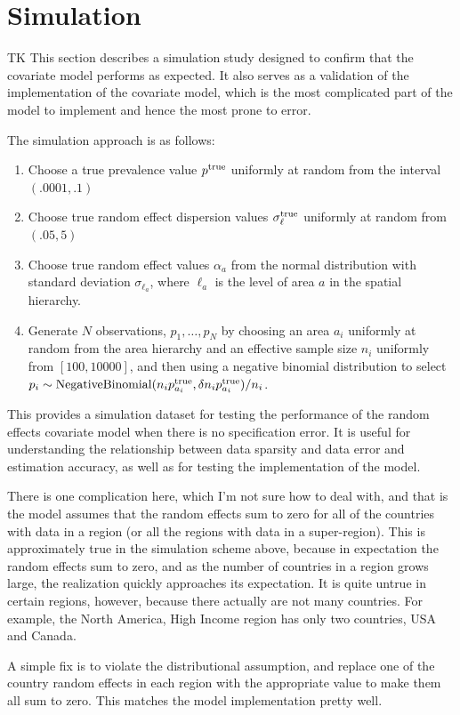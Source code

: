 \section{Simulation}
TK This section describes a simulation study designed to confirm that
the covariate model performs as expected.  It also serves as a
validation of the implementation of the covariate model, which is the
most complicated part of the model to implement and hence the most
prone to error.

The simulation approach is as follows:
\begin{enumerate}
\item Choose a true prevalence value $p^{\text{true}}$ uniformly at random
  from the interval $(.0001, .1)$
\item Choose true random effect dispersion values $\sigma_\ell^{\text{true}}$
  uniformly at random from $(.05, 5)$ \item Choose true random effect
  values $\alpha_a$ from the normal distribution with standard
  deviation $\sigma_{\ell_a}$, where $\ell_a$ is the level of area $a$
  in the spatial hierarchy.
\item Generate $N$ observations, $p_1,\ldots,p_N$ by choosing an area
  $a_i$ uniformly at random from the area hierarchy and an effective
  sample size $n_i$ uniformly from $[100,10000]$, and then using a
  negative binomial distribution to select $p_i \sim
  \operatorname{NegativeBinomial}(n_i p^{\text{true}}_{a_i}, \delta n_i
  p^{\text{true}}_{a_i})/n_i$.
\end{enumerate}

This provides a simulation dataset for testing the performance of the
random effects covariate model when there is no specification
error. It is useful for understanding the relationship between data
sparsity and data error and estimation accuracy, as well as for
testing the implementation of the model.

There is one complication here, which I'm not sure how to deal with,
and that is the model assumes that the random effects sum to zero for
all of the countries with data in a region (or all the regions with
data in a super-region).  This is approximately true in the simulation
scheme above, because in expectation the random effects sum to zero,
and as the number of countries in a region grows large, the
realization quickly approaches its expectation.  It is quite untrue in
certain regions, however, because there actually are not many
countries.  For example, the North America, High Income region has
only two countries, USA and Canada.

A simple fix is to violate the distributional assumption, and replace
one of the country random effects in each region with the appropriate
value to make them all sum to zero.  This matches the model
implementation pretty well.

